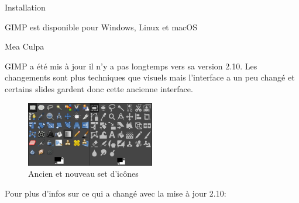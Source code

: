 \documentclass[10pt,svgnames,usenames,table]{beamer}
\begin{document}
\begin{frame}{Installation}
	\begin{center}
	GIMP est disponible pour Windows, Linux et macOS
	\vspace{1cm}\Large
	\end{center}
\end{frame}

\begin{frame}{Mea Culpa}
	\begin{center}
	GIMP a été mis à jour il n'y a pas longtemps vers sa version 2.10.
	Les changements sont plus techniques que visuels mais l'interface a un 
	peu changé et certains slides gardent donc cette ancienne interface.

	\begin{figure}
	    \centering
	    \includegraphics[width=0.50\textwidth]{Images/28to210_icons}
	    \caption{Ancien et nouveau set d'icônes}
	\end{figure} 
	Pour plus d'infos sur ce qui a changé avec la mise à jour 2.10:
	\end{center}
\end{frame}
\end{document}
